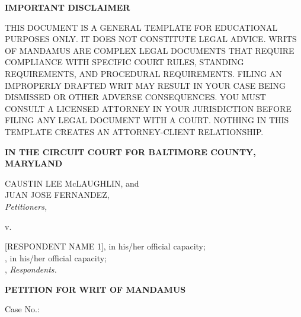 \documentclass[12pt]{article}
\begin{document}
\begin{center}
\textbf{\large IMPORTANT DISCLAIMER}
\end{center}

\begin{singlespace}
\small
THIS DOCUMENT IS A GENERAL TEMPLATE FOR EDUCATIONAL PURPOSES ONLY. 
IT DOES NOT CONSTITUTE LEGAL ADVICE. WRITS OF MANDAMUS ARE COMPLEX 
LEGAL DOCUMENTS THAT REQUIRE COMPLIANCE WITH SPECIFIC COURT RULES, 
STANDING REQUIREMENTS, AND PROCEDURAL REQUIREMENTS. FILING AN 
IMPROPERLY DRAFTED WRIT MAY RESULT IN YOUR CASE BEING DISMISSED 
OR OTHER ADVERSE CONSEQUENCES. YOU MUST CONSULT A LICENSED 
ATTORNEY IN YOUR JURISDICTION BEFORE FILING ANY LEGAL DOCUMENT 
WITH A COURT. NOTHING IN THIS TEMPLATE CREATES AN ATTORNEY-CLIENT 
RELATIONSHIP.
\end{singlespace}

\vspace{1in}
\newpage

\begin{center}
\textbf{\Large IN THE CIRCUIT COURT FOR BALTIMORE COUNTY, MARYLAND}
\vspace{0.5in}

CAUSTIN LEE McLAUGHLIN, and \\
JUAN JOSE FERNANDEZ, \\
\textit{Petitioners,}

\vspace{0.3in}
v.
\vspace{0.3in}

[RESPONDENT NAME 1], in his/her official capacity; \\
[RESPONDENT NAME 2], in his/her official capacity; \\
[ADD ADDITIONAL RESPONDENTS AS NEEDED],
\textit{Respondents.}

\vspace{0.5in}

\textbf{\large PETITION FOR WRIT OF MANDAMUS}
\vspace{0.25in}

Case No.: \underline{\hspace{2in}}
\end{center}

\vspace{0.75in}
\end{document}
